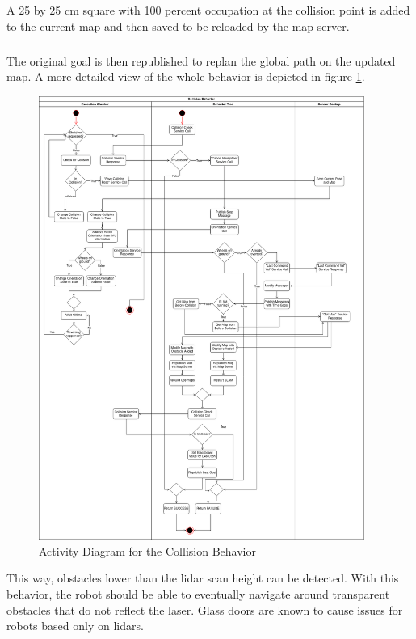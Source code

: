 A 25 by 25 cm square with 100 percent occupation at the collision point is added to the current map and then saved to be reloaded by the map server. 

\subparagraph*{}
The original goal is then republished to replan the global path on the updated map. A more detailed view of the whole behavior is depicted in figure \ref{fig:activity_diagram_collision}.

\begin{figure}[ht]
	\includegraphics[width=0.95\textwidth]{images/activity_diagram_collision.png}
	\caption{Activity Diagram for the Collision Behavior}
	\label{fig:activity_diagram_collision}
\end{figure}

This way, obstacles lower than the lidar scan height can be detected. With this behavior, the robot should be able to eventually navigate around transparent obstacles that do not reflect the laser. Glass doors are known to cause issues for robots based only on lidars. 

